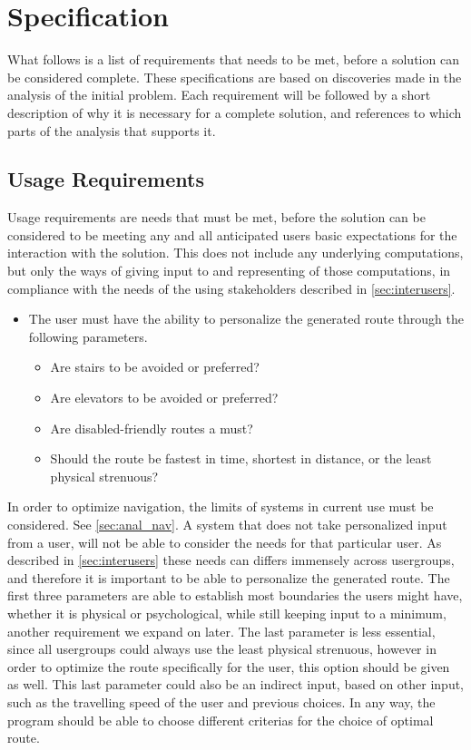 \section{Specification} %
\label{sec:specification}

What follows is a list of requirements that needs to be met, before a solution can be considered complete. These specifications are based on discoveries made in the analysis of the initial problem. Each requirement will be followed by a short description of why it is necessary for a complete solution, and references to which parts of the analysis that supports it.

\subsection{Usage Requirements}

Usage requirements are needs that must be met, before the solution can be considered to be meeting any and all anticipated users basic expectations for the interaction with the solution. This does not include any underlying computations, but only the ways of giving input to and representing of those computations, in compliance with the needs of the using stakeholders described in \cref{sec:interusers}.

\begin{itemize}
	\item The user must have the ability to personalize the generated route through the following parameters.
			\begin{itemize}
				\item Are stairs to be avoided or preferred?
				\item Are elevators to be avoided or preferred?
				\item Are disabled-friendly routes a must?
				\item Should the route be fastest in time, shortest in distance, or the least physical strenuous?
			\end{itemize}
\end{itemize}
In order to optimize navigation, the limits of systems in current use must be considered. See \cref{sec:anal_nav}. A system that does not take personalized input from a user, will not be able to consider the needs for that particular user. As described in \cref{sec:interusers} these needs can differs immensely across usergroups, and therefore it is important to be able to personalize the generated route.
The first three parameters are able to establish most boundaries the users might have, whether it is physical or psychological, while still keeping input to a minimum, another requirement we expand on later. The last parameter is less essential, since all usergroups could always use the least physical strenuous, however in order to optimize the route specifically for the user, this option should be given as well. This last parameter could also be an indirect input, based on other input, such as the travelling speed of the user and previous choices. In any way, the program should be able to choose different criterias for the choice of optimal route.

